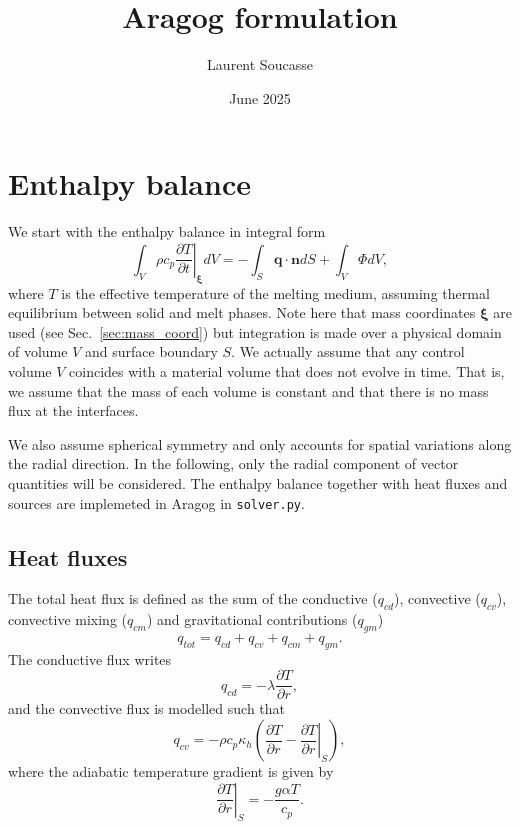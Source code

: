 \documentclass{article}
\title{Aragog formulation}
\date{June 2025}
\author{Laurent Soucasse}
\renewcommand{\vec}[1]{\boldsymbol{#1}}
\begin{document}
\maketitle

\tableofcontents

\section{Enthalpy balance}

We start with the enthalpy balance in integral form
\begin{equation}
\int_V \rho c_p \left.\frac{\partial T}{\partial t}\right|_{\vec{\xi}} dV =  -\int_S \vec{q}\cdot\vec{n} dS + \int_V \Phi dV,
\label{eq.enthalpybalance}
\end{equation}
where $T$ is the effective temperature of the melting medium, assuming thermal equilibrium between solid and melt phases. Note here that mass coordinates $\vec{\xi}$ are used (see Sec.~\ref{sec:mass_coord}) but integration is made over a physical domain of volume $V$ and surface boundary $S$. We actually assume that any control volume $V$ coincides with a material volume that does not evolve in time. That is, we assume that the mass of each volume is constant and that there is no mass flux at the interfaces.

We also assume spherical symmetry and only accounts for spatial variations along the radial direction. In the following, only the radial component of vector quantities will be considered.
The enthalpy balance together with heat fluxes and sources are implemeted in Aragog in \texttt{solver.py}.

\subsection{Heat fluxes}
The total heat flux is defined as the sum of the conductive ($q_{cd}$), convective ($q_{cv}$), convective mixing ($q_{cm}$) and gravitational contributions ($q_{gm}$)
\begin{equation}
q_{tot}= q_{cd} + q_{cv} + q_{cm} + q_{gm}.
\end{equation}
The conductive flux writes
\begin{equation}
    q_{cd} = -\lambda \frac{\partial T}{\partial r},
    \label{eq.qcd}
\end{equation}
and the convective flux is modelled such that
\begin{equation}
    q_{cv} = -\rho c_p \kappa_h \left( \frac{\partial T}{\partial r} - \left.\frac{\partial T}{\partial r}\right|_S\right),
    \label{eq.qcv}
\end{equation}
where the adiabatic temperature gradient is given by
\begin{equation}
    \left.\frac{\partial T}{\partial r}\right|_S = -\frac{g\alpha T}{c_p}.
    \label{eq.adiabat}
\end{equation}
\end{document}
